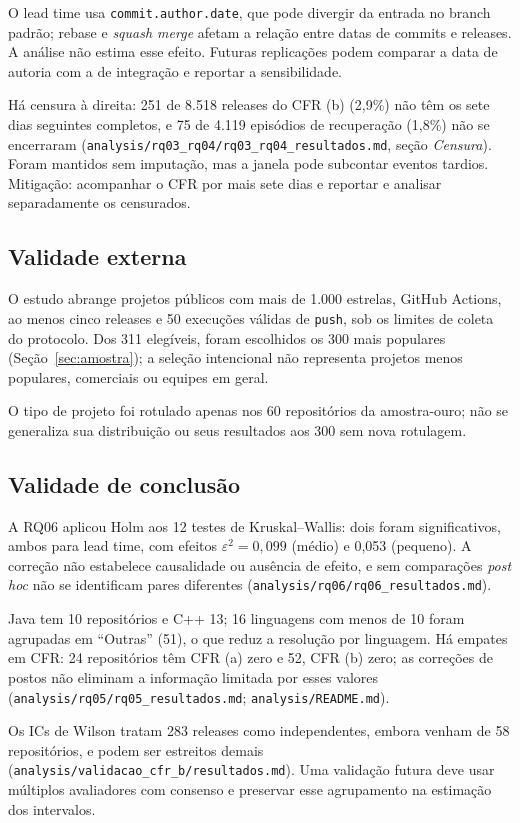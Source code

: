 O lead time usa \texttt{commit.author.date}, que pode divergir da entrada no
branch padrão; rebase e \textit{squash merge} afetam a relação entre datas de
commits e releases. A análise não estima esse efeito. Futuras replicações
podem comparar a data de autoria com a de integração e reportar a sensibilidade.

Há censura à direita: 251 de 8.518 releases do CFR (b) (2,9\%) não têm os sete
dias seguintes completos, e 75 de 4.119 episódios de recuperação (1,8\%) não
se encerraram (\texttt{analysis/rq03\_rq04/rq03\_rq04\_resultados.md},
seção \textit{Censura}). Foram mantidos sem imputação, mas a janela pode
subcontar eventos tardios. Mitigação: acompanhar o CFR por mais sete dias e
reportar e analisar separadamente os censurados.

\subsection{Validade externa}
\label{sec:ameacas-externa}

O estudo abrange projetos públicos com mais de 1.000 estrelas, GitHub Actions,
ao menos cinco releases e 50 execuções válidas de \texttt{push}, sob os
limites de coleta do protocolo. Dos 311 elegíveis, foram escolhidos os 300
mais populares (Seção~\ref{sec:amostra}); a seleção intencional não representa
projetos menos populares, comerciais ou equipes em geral.

O tipo de projeto foi rotulado apenas nos 60 repositórios da amostra-ouro;
não se generaliza sua distribuição ou seus resultados aos 300 sem nova
rotulagem.

\subsection{Validade de conclusão}
\label{sec:ameacas-conclusao}

A RQ06 aplicou Holm aos 12 testes de Kruskal--Wallis: dois foram significativos,
ambos para lead time, com efeitos $\varepsilon^2 = 0,099$ (médio) e 0,053
(pequeno). A correção não estabelece causalidade ou ausência de efeito, e sem
comparações \textit{post hoc} não se identificam pares diferentes
(\texttt{analysis/rq06/rq06\_resultados.md}).

Java tem 10 repositórios e C++ 13; 16 linguagens com menos de 10 foram agrupadas
em ``Outras'' (51), o que reduz a resolução por linguagem. Há empates em CFR:
24 repositórios têm CFR (a) zero e 52, CFR (b) zero; as correções de postos não
eliminam a informação limitada por esses valores
(\texttt{analysis/rq05/rq05\_resultados.md}; \texttt{analysis/README.md}).

Os ICs de Wilson tratam 283 releases como independentes, embora venham de 58
repositórios, e podem ser estreitos demais
(\texttt{analysis/validacao\_cfr\_b/resultados.md}). Uma validação futura deve
usar múltiplos avaliadores com consenso e preservar esse agrupamento na estimação
dos intervalos.
